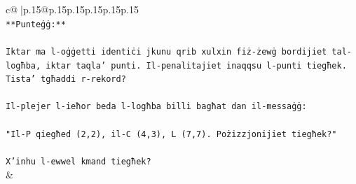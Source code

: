 \documentclass{article}
\begin{document}
{\begin{supertabular}{c@{$\;$}|p{.15\linewidth}@{}p{.15\linewidth}p{.15\linewidth}p{.15\linewidth}p{.15\linewidth}p{.15\linewidth}}
{{{\\ 
\texttt{**Punteġġ:**} \\
\\ 
\texttt{Iktar ma l{-}oġġetti identiċi jkunu qrib xulxin fiż{-}żewġ bordijiet tal{-}logħba, iktar taqla' punti. Il{-}penalitajiet inaqqsu l{-}punti tiegħek. Tista' tgħaddi r{-}rekord?} \\
\\ 
\texttt{Il{-}plejer l{-}ieħor beda l{-}logħba billi bagħat dan il{-}messaġġ:} \\
\\ 
\texttt{"Il{-}P qiegħed (2,2), il{-}C (4,3), L (7,7). Pożizzjonijiet tiegħek?"} \\
\\ 
\texttt{X'inhu l{-}ewwel kmand tiegħek?} \\
            }
        }
    }
    & \\ \\


\end{supertabular}}
\end{document}
